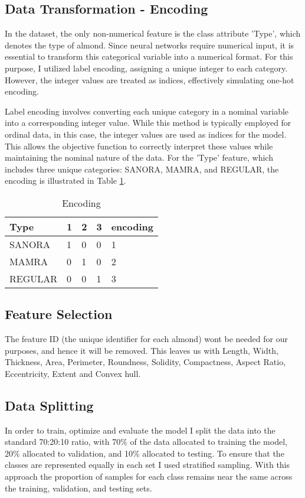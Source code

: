 \documentclass[conference]{IEEEtran}
\begin{document}
\subsection{Data Transformation - Encoding}
In the dataset, the only non-numerical feature is the class attribute 'Type', which denotes the type of almond. Since neural networks require numerical input, it is essential to transform this categorical variable into a numerical format. For this purpose, I utilized label encoding, assigning a unique integer to each category. However, the integer values are treated as indices, effectively simulating one-hot encoding. 

Label encoding involves converting each unique category in a nominal variable into a corresponding integer value. While this method is typically employed for ordinal data, in this case, the integer values are used as indices for the model. This allows the objective function to correctly interpret these values while maintaining the nominal nature of the data. For the 'Type' feature, which includes three unique categories: SANORA, MAMRA, and REGULAR, the encoding is illustrated in Table \ref{tab:encoding_matrix}.

\begin{table}[h]
    \centering
    \caption{Encoding}
    \small
    \begin{tabular}{|p{1.5cm}|p{0.5cm}|p{0.5cm}|p{0.5cm}|p{1.1cm}|}
        \hline
        \textbf{Type} & \textbf{1} & \textbf{2} & \textbf{3} & \textbf{encoding} \\
        \hline
        SANORA    & 1 & 0 & 0 & 1\\
        \hline
        MAMRA     & 0 & 1 & 0 & 2\\
        \hline
        REGULAR 	 & 0 & 0 & 1 & 3\\
        \hline
    \end{tabular}
    \label{tab:encoding_matrix}
\end{table}

\subsection{Feature Selection}
The feature ID (the unique identifier for each almond) wont be needed for our purposes, and hence it will be removed. This leaves us with Length, Width, Thickness, Area, Perimeter, Roundness, Solidity, Compactness, Aspect Ratio, Eccentricity, Extent and Convex hull. 

\subsection{Data Splitting}
In order to train, optimize and evaluate the model I split the data into the standard 70:20:10 ratio, with 70\% of the data allocated to training the model, 20\% allocated to validation, and 10\% allocated to testing. To ensure that the classes are represented equally in each set I used stratified sampling. With this approach the proportion of samples for each class remains near the same across the training, validation, and testing sets.
\newline \\
\end{document}

